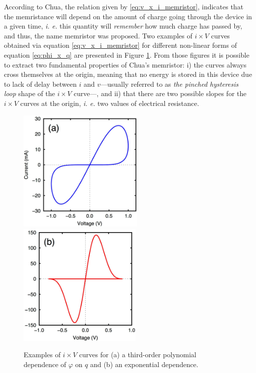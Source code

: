 According to Chua, the relation given by \ref{eq:v_x_i_memristor}, indicates that the memristance will depend on the amount of charge going through the device in a given time, {\em i. e.} this quantity will {\em remember} how much charge has passed by, and thus, the name memristor was proposed. Two examples of $i \times V$ curves obtained via equation \ref{eq:v_x_i_memristor} for different non-linear forms of equation \ref{eq:phi_x_q} are presented in Figure \ref{fig:lissajous-theo}. From those figures it is possible to extract two fundamental properties of Chua's memristor: i) the curves always cross themselves at the origin, meaning that no energy is stored in this device due to lack of delay between $i$ and $v$---usually referred to as {\em the pinched hysteresis loop} shape of the $i \times V$ curve---, and ii) that there are two possible slopes for the $i \times V$ curves at the origin, {\em i. e.} two values of electrical resistance.
\begin{center}
  \begin{figure}[h!]
    \begin{center}
      \includegraphics[height=6cm]{img/lissajous-01.jpg}
      \includegraphics[height=6cm]{img/lissajous-02.jpg}
      \caption{Examples of $i \times V$ curves for (a) a third-order polynomial dependence of $\varphi$ on $q$ and (b) an exponential dependence.} 
      \label{fig:lissajous-theo} 
    \end{center}
  \end{figure}
\end{center}

